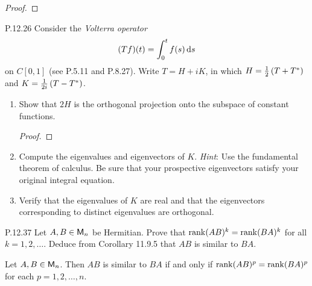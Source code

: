 \documentclass{../homework}
\begin{document}
\begin{problems}
  \begin{solution}
    \begin{proof}

    \end{proof}
  \end{solution}

\item[P.12.26] Consider the \emph{Volterra operator}
  \[
    (Tf)(t) = \int_0^t f(s) \mathop{}\! \mathrm d s
  \]
  on \(C[0, 1]\) (see P.5.11 and P.8.27).  Write \(T = H + iK\), in
  which \(H = \frac 1 2 \left( {T + T^*} \right)\) and
  \(K = \frac{1}{2i} \left( {T - T^*} \right)\).
  \begin{enumerate}
  \item Show that \(2H\) is the orthogonal projection onto the
    subspace of constant functions.

    \begin{solution}
      \begin{proof}

      \end{proof}
    \end{solution}

  \item Compute the eigenvalues and eigenvectors of \(K\).
    \textit{Hint}: Use the fundamental theorem of calculus.  Be sure
    that your prospective eigenvectors satisfy your original integral
    equation.

    \begin{solution}

    \end{solution}

  \item Verify that the eigenvalues of \(K\) are real and that the
    eigenvectors corresponding to distinct eigenvalues are orthogonal.

    \begin{solution}

    \end{solution}
  \end{enumerate}

\item[P.12.37] Let \(A, B \in \mathsf{M}_n\) be Hermitian.  Prove that
  \(\operatorname{rank} (AB)^k = \operatorname{rank} (BA)^k\) for all \(k = 1, 2, \dots\).  Deduce
  from Corollary 11.9.5 that \(AB\) is similar to \(BA\).

  \begin{bookcorollary}[11.9.5]
    Let \(A, B \in \mathsf{M}_n\).  Then \(AB\) is similar to \(BA\) if and
    only if \(\operatorname{rank} (AB)^p = \operatorname{rank} (BA)^p\) for each
    \(p = 1, 2, \dots, n\).
  \end{bookcorollary}


\end{problems}
\end{document}
